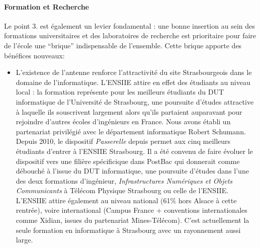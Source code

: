 \documentclass[11pt]{article}
\begin{document}
\paragraph{Formation et Recherche}
Le point 3.  est  également un levier fondamental : une  bonne insertion au sein
des formations universitaires  et des laboratoires de  recherche est prioritaire
pour faire de l'école une  ``brique'' indispensable de l'ensemble.  Cette brique
apporte des bénéfices nouveaux:
\begin{itemize}

\item L'existence  de l'antenne  renforce l'attractivité du  site Strasbourgeois
  dans le domaine  de l'informatique. L'ENSIIE attire en effet  des étudiants au
  niveau local  : la formation  représente pour  les meilleurs étudiants  du DUT
  informatique de l'Université de  Strasbourg, une poursuite d'études attractive
  à laquelle  ils souscrivent largement  alors qu'ils partaient  auparavant pour
  rejoindre  d'autres  écoles d'ingénieurs  en  France.   Nous avons  établi  un
  partenariat    privilégié   avec    le    département   informatique    Robert
  Schumann. Depuis  2010, le dispositif  \textit {Passerelle} depuis  permet aux
  cinq meilleurs étudiants  d'entrer à l'ENSIIE Strasbourg. Il a  été convenu de
  faire évoluer  le dispositif  vers une filière  spécificique dans  PostBac qui
  donnerait comme débouché à l'issue du DUT informatique, une poursuite d'études
  dans l'une des deux formations d'ingénieur, \textit{Infrastructures Numériques
    et Objets Communicants} à Télécom  Physique Strasbourg ou celle de l'ENSIIE.
  L'ENSIIE  attire  également au  niveau  national  (61\%  hors Alsace  à  cette
  rentrée),  voire international  (Campus France  + conventions  internationales
  comme  Xidian, issues  du partenariat  Mines-Télécom).  C'est  actuellement la
  seule formation en informatique à Strasbourg avec un rayonnement aussi large.


\end{itemize}
\end{document}
